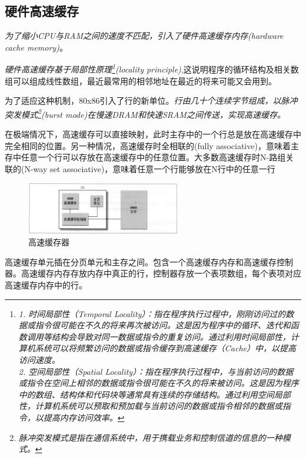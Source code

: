 \subsection{硬件高速缓存}

    \emph{为了缩小CPU与RAM之间的速度不匹配，引入了硬件高速缓存内存(hardware cache memory)}。

    \emph{硬件高速缓存基于局部性原理\footnote[1]{\emph{
        1. 时间局部性（Temporal Locality）：指在程序执行过程中，刚刚访问过的数据或指令很可能在不久的将来再次被访问。这是因为程序中的循环、迭代和函数调用等结构会导致对同一数据或指令的重复访问。通过利用时间局部性，计算机系统可以将频繁访问的数据或指令缓存到高速缓存（Cache）中，以提高访问速度。\\
        2. 空间局部性（Spatial Locality）：指在程序执行过程中，与当前访问的数据或指令在空间上相邻的数据或指令很可能在不久的将来被访问。这是因为程序中的数组、结构体和代码块等通常具有连续的存储结构。通过利用空间局部性，计算机系统可以预取和预加载与当前访问的数据或指令相邻的数据或指令，以提高内存访问效率。}
    }(locality principle)},这说明程序的循环结构及相关数组可以组成线性数组，最近最常用的相邻地址在最近的将来可能又会用到。

    为了适应这种机制，80x86引入了行的新单位。\emph{行由几十个连续字节组成，以脉冲突发模式\footnote[2]{\emph{脉冲突发模式是指在通信系统中，用于携载业务和控制信道的信息的一种模式。}}(burst mode)在慢速DRAM和快速SRAM之间传送，实现高速缓存。}

    在极端情况下，高速缓存可以直接映射，此时主存中的一个行总是放在高速缓存中完全相同的位置。另一种情况，高速缓存时全相联的(fully associative)，意味着主存中任意一个行可以存放在高速缓存中的任意位置。大多数高速缓存时N-路组关联的(N-way set associative)，意味着任意一个行能够放在N行中的任意一行

\begin{figure}[!htbp]
    \centering
    \includegraphics[width=0.6\textwidth]{image/chapter02/高速缓存器.png}
    \caption{高速缓存器}
\end{figure}    

    高速缓存单元插在分页单元和主存之间。包含一个高速缓存内存和高速缓存控制器。高速缓存内存存放内存中真正的行，控制器存放一个表项数组，每个表项对应高速缓存内存中的行。


